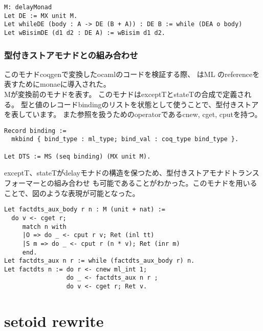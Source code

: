 \documentclass[japanese]{jssst_ppl}
\theoremstyle{definition}
\begin{document}
  \begin{verbatim}
M: delayMonad
Let DE := MX unit M.
Let whileDE (body : A -> DE (B + A)) : DE B := while (DEA o body)
Let wBisimDE (d1 d2 : DE A) := wBisim d1 d2.
        \end{verbatim}

  \subsubsection{型付きストアモナドとの組み合わせ}
  このモナドcoqgenで変換したocamlのコードを検証する際、
  はML のreferenceを表すためにmonaeに導入された。\\
  Mが変換前のモナドを表す。
  このモナドはexceptTとstateTの合成で定義される。
  型と値のレコードbindingのリストを状態として使うことで、型付きストアを表しています。
  また参照を扱うためのoperatorであるcnew, cget, cputを持つ。
  \begin{verbatim}
Record binding :=
  mkbind { bind_type : ml_type; bind_val : coq_type bind_type }.

Let DTS := MS (seq binding) (MX unit M).
        \end{verbatim}

  exceptT、stateTがdelayモナドの構造を保つため、型付きストアモナドトランスフォーマーとの組み合わせ
  も可能であることがわかった。このモナドを用いることで、図のような表現が可能となった。

  \begin{verbatim}
Let factdts_aux_body r n : M (unit + nat) :=
  do v <- cget r;
     match n with
     |O => do _ <- cput r v; Ret (inl tt)
     |S m => do _ <- cput r (n * v); Ret (inr m)
     end.
Let factdts_aux n r := while (factdts_aux_body r) n.
Let factdts n := do r <- cnew ml_int 1;
                 do _ <- factdts_aux n r ;
                 do v <- cget r; Ret v.
            \end{verbatim}


\fi


\section{setoid rewrite}

\end{document}
